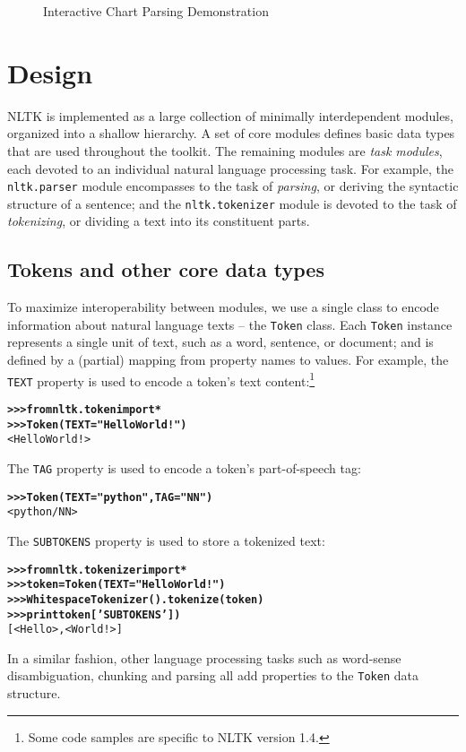 \documentclass[11pt]{article}
\def\object#1{\texttt{\small #1}}
\begin{document}
\begin{figure}[bth]
\caption{Interactive Chart Parsing Demonstration}
\label{fig:chart}
\end{figure}

\section{Design}

NLTK is implemented as a large collection of minimally interdependent
modules, organized into a shallow hierarchy.  A set of core
modules defines basic data types that are used throughout the toolkit.
The remaining modules are \emph{task modules}, each devoted to an
individual natural language processing task.  For example, the
\object{nltk.parser} module encompasses to the task of
\emph{parsing}, or deriving the syntactic structure of a sentence; and
the \object{nltk.tokenizer} module is devoted to the task of
\emph{tokenizing}, or dividing a text into its constituent parts.

\subsection{Tokens and other core data types}

To maximize interoperability between modules, we use a
single class to encode information about natural language texts -- the
\object{Token} class.  Each \object{Token} instance represents a
single unit of text, such as a word, sentence, or document; and is
defined by a (partial) mapping from property names to values.  For
example, the \object{TEXT} property is used to encode a token's text
content:\footnote{Some code samples are specific to NLTK
  version 1.4.}

\begin{alltt}\small
\textbf{>>> from nltk.token import *}
\textbf{>>> Token(TEXT="Hello World!")}
<Hello World!>
\end{alltt}
%
The \object{TAG} property is used to encode a token's part-of-speech
tag:

\begin{alltt}\small
\textbf{>>> Token(TEXT="python", TAG="NN")}
<python/NN>
\end{alltt}
%
The \object{SUBTOKENS} property is used to store a tokenized text:

\begin{alltt}\small
\textbf{>>> from nltk.tokenizer import *}
\textbf{>>> token = Token(TEXT="Hello World!")}
\textbf{>>> WhitespaceTokenizer().tokenize(token)}
\textbf{>>> print token['SUBTOKENS'])}
[<Hello>, <World!>]
\end{alltt}
%
In a similar fashion, other language processing tasks such as
word-sense disambiguation, chunking and parsing all add properties to
the \object{Token} data structure.
\end{document}
